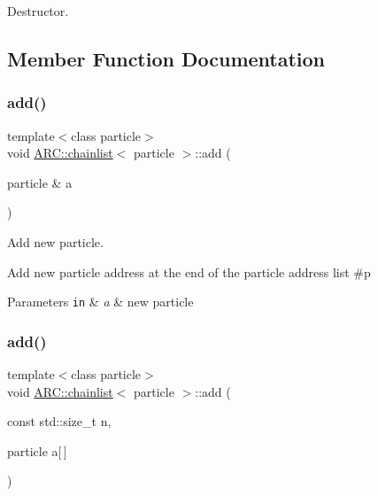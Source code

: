Destructor. 



\subsection{Member Function Documentation}
\hypertarget{classARC_1_1chainlist_afa780edfa301cc22cf189e63d7a59c2c}{}\label{classARC_1_1chainlist_afa780edfa301cc22cf189e63d7a59c2c} 
\subsubsection{\texorpdfstring{add()}{add()}\hspace{0.1cm}{\footnotesize\ttfamily [1/3]}}
{\footnotesize\ttfamily template$<$class particle$>$ \\
void \hyperlink{classARC_1_1chainlist}{A\+R\+C\+::chainlist}$<$ particle $>$\+::add (\begin{DoxyParamCaption}\item[{particle \&}]{a }\end{DoxyParamCaption})\hspace{0.3cm}{\ttfamily [inline]}}



Add new particle. 

Add new particle address at the end of the particle address list \#p 
\begin{DoxyParams}[1]{Parameters}
\mbox{\tt in}  & {\em a} & new particle \\
\hline
\end{DoxyParams}
\hypertarget{classARC_1_1chainlist_a2dba82eb1c3caa32fc76b619c5379da5}{}\label{classARC_1_1chainlist_a2dba82eb1c3caa32fc76b619c5379da5} 
\subsubsection{\texorpdfstring{add()}{add()}\hspace{0.1cm}{\footnotesize\ttfamily [2/3]}}
{\footnotesize\ttfamily template$<$class particle$>$ \\
void \hyperlink{classARC_1_1chainlist}{A\+R\+C\+::chainlist}$<$ particle $>$\+::add (\begin{DoxyParamCaption}\item[{const std\+::size\+\_\+t}]{n,  }\item[{particle}]{a\mbox{[}$\,$\mbox{]} }\end{DoxyParamCaption})\hspace{0.3cm}{\ttfamily [inline]}}



